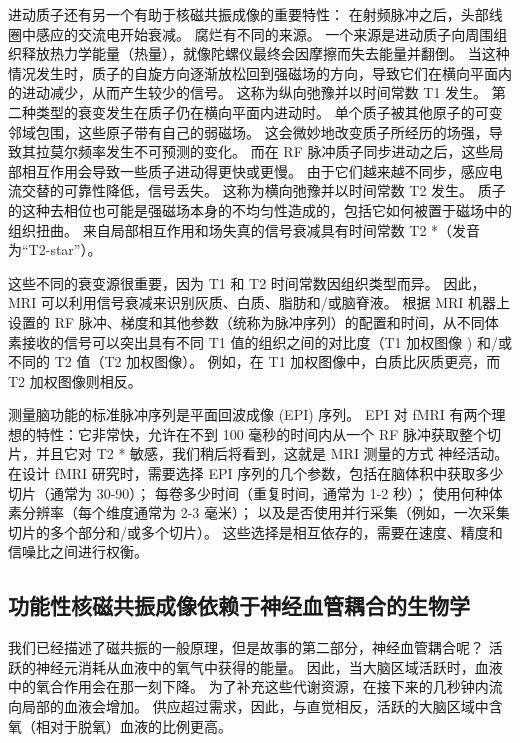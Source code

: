 进动质子还有另一个有助于核磁共振成像的重要特性：
在射频脉冲之后，头部线圈中感应的交流电开始衰减。 
腐烂有不同的来源。 
一个来源是进动质子向周围组织释放热力学能量（热量），就像陀螺仪最终会因摩擦而失去能量并翻倒。 
当这种情况发生时，质子的自旋方向逐渐放松回到强磁场的方向，导致它们在横向平面内的进动减少，从而产生较少的信号。 
这称为纵向弛豫并以时间常数 T1 发生。 
第二种类型的衰变发生在质子仍在横向平面内进动时。 
单个质子被其他原子的可变邻域包围，这些原子带有自己的弱磁场。 
这会微妙地改变质子所经历的场强，导致其拉莫尔频率发生不可预测的变化。 
而在 RF 脉冲质子同步进动之后，这些局部相互作用会导致一些质子进动得更快或更慢。 
由于它们越来越不同步，感应电流交替的可靠性降低，信号丢失。 
这称为横向弛豫并以时间常数 T2 发生。 
质子的这种去相位也可能是强磁场本身的不均匀性造成的，包括它如何被置于磁场中的组织扭曲。 
来自局部相互作用和场失真的信号衰减具有时间常数 T2 *（发音为“T2-star”）。


这些不同的衰变源很重要，因为 T1 和 T2 时间常数因组织类型而异。 
因此，MRI 可以利用信号衰减来识别灰质、白质、脂肪和/或脑脊液。 
根据 MRI 机器上设置的 RF 脉冲、梯度和其他参数（统称为脉冲序列）的配置和时间，从不同体素接收的信号可以突出具有不同 T1 值的组织之间的对比度（T1 加权图像 ) 和/或不同的 T2 值（T2 加权图像）。 
例如，在 T1 加权图像中，白质比灰质更亮，而 T2 加权图像则相反。


测量脑功能的标准脉冲序列是平面回波成像 (EPI) 序列。 
EPI 对 fMRI 有两个理想的特性：它非常快，允许在不到 100 毫秒的时间内从一个 RF 脉冲获取整个切片，并且它对 T2 * 敏感，我们稍后将看到，这就是 MRI 测量的方式 神经活动。 
在设计 fMRI 研究时，需要选择 EPI 序列的几个参数，包括在脑体积中获取多少切片（通常为 30-90）； 
每卷多少时间（重复时间，通常为 1-2 秒）； 使用何种体素分辨率（每个维度通常为 2-3 毫米）； 
以及是否使用并行采集（例如，一次采集切片的多个部分和/或多个切片）。 
这些选择是相互依存的，需要在速度、精度和信噪比之间进行权衡。



\subsection{功能性核磁共振成像依赖于神经血管耦合的生物学}

我们已经描述了磁共振的一般原理，但是故事的第二部分，神经血管耦合呢？
活跃的神经元消耗从血液中的氧气中获得的能量。 
因此，当大脑区域活跃时，血液中的氧合作用会在那一刻下降。
为了补充这些代谢资源，在接下来的几秒钟内流向局部的血液会增加。
供应超过需求，因此，与直觉相反，活跃的大脑区域中含氧（相对于脱氧）血液的比例更高。


